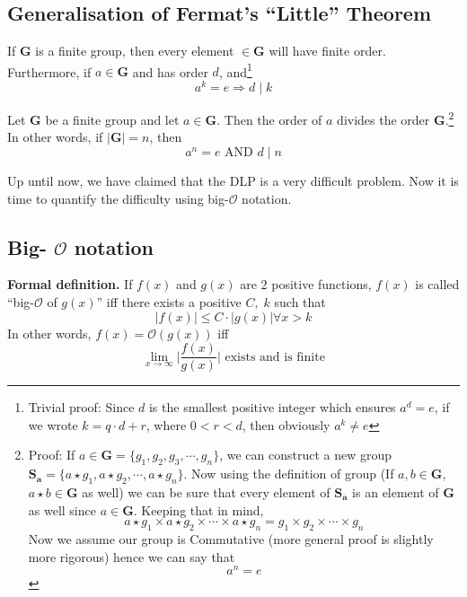 \begin{mdframed}
			\subsection{Generalisation of Fermat's ``Little'' Theorem}
				
				If \(\mathbf{G}\) is a finite group, then every element \(\in \mathbf{G}\) will have finite order. \\ Furthermore, if \(a \in\mathbf{G}\) and has order \(d\), and\footnote{Trivial proof: Since \(d\) is the smallest positive integer which ensures \(a^d=e\), if we wrote \(k=q\cdot d + r\), where \(0<r<d\), then obviously \(a^k \not = e\)} \[a^k = e\Rightarrow d\;|\;k\]
			
			\begin{tcolorbox}[title=Lagrange's Theorem,colback=green!5!white,colframe=green!75!black]\label{theo:LagrangeTheo}
				Let \(\mathbf{G}\) be a finite group and let \(a \in \mathbf{G}\). Then the order of $a$ divides the order \(\mathbf{G}\).\footnote{Proof: If \(a\in\mathbf{G}=\{g_1, g_2, g_3, \cdots, g_n\}\), we can construct a new group \(\mathbf{S_a}=\{a\star g_1, a\star g_2, \cdots, a\star g_n\}\). Now using the definition of group (If \(a, b\in \mathbf{G}\), \(a\star b \in \mathbf{G}\) as well) we can be sure that every element of \(\mathbf{S_a}\) is an element of \(\mathbf{G}\) as well since \(a \in \mathbf{G}\). Keeping that in mind, \[a\star g_1 \times a\star g_2 \times \cdots \times a\star g_n = g_1 \times g_2 \times \cdots \times g_n\] Now we assume our group is Commutative (more general proof is slightly more rigorous) hence we can say that \[a^n = e\]}
				\tcblower
				\normalsize In other words, if \(|\mathbf{G}|=n\), then \[a^n=e \text{ AND } d\;|\;n\]
			\end{tcolorbox}
	\end{mdframed}

		Up until now, we have claimed that the DLP is a very difficult problem. Now it is time to quantify the difficulty using big-\(\mathcal{O}\) notation.

		\subsection{Big- \(\mathcal{O}\) notation}
			\begin{tcolorbox}
				\textbf{Formal definition.} If $f(x)$ and $g(x)$ are 2 positive functions, $f(x)$ is called ``big-\(\mathcal{O}\) of $g(x)$'' iff there exists a positive $C,\; k$ such that \[|f(x)|\leq C\cdot |g(x)| \forall x>k\]
				\tcblower
				In other words, $f(x)= \mathcal{O}(g(x))$ iff \[\lim_{x\to\infty} \bigg|\frac{f(x)}{g(x)}\bigg|\text{ exists and is finite}\] 
			\end{tcolorbox}

